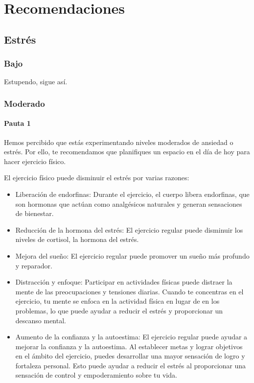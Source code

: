 \chapter{Recomendaciones}
\label{chapter:recomendaciones}

    \section{Estrés}
        \subsection{Bajo}
            Estupendo, sigue así. 
        \subsection{Moderado}
            \subsubsection{Pauta 1}
                Hemos percibido que estás experimentando niveles moderados de ansiedad o estrés. 
                Por ello, te recomendamos que planifiques un espacio en el día de hoy para hacer ejercicio físico.

                El ejercicio físico puede disminuir el estrés por varias razones:
                \begin{itemize}
                    \item Liberación de endorfinas: Durante el ejercicio, el cuerpo libera endorfinas, que son hormonas que  actúan como analgésicos naturales y generan sensaciones de bienestar. 
                    \item Reducción de la hormona del estrés: El ejercicio regular puede disminuir los niveles de cortisol, la hormona del estrés.
                    \item Mejora del sueño: El ejercicio regular puede promover un sueño más profundo y reparador.
                    \item Distracción y enfoque: Participar en actividades físicas puede distraer la mente de las preocupaciones y tensiones diarias. Cuando te concentras en el ejercicio, tu mente se enfoca en la actividad física en lugar de en los problemas, lo que puede ayudar a reducir el estrés y proporcionar un descanso mental.
                    \item Aumento de la confianza y la autoestima: El ejercicio regular puede ayudar a mejorar la confianza y la autoestima. Al establecer metas y lograr objetivos en el ámbito del ejercicio, puedes desarrollar una mayor sensación de logro y fortaleza personal. Esto puede ayudar a reducir el estrés al 
                    proporcionar una sensación de control y empoderamiento sobre tu vida.
                \end{itemize}

